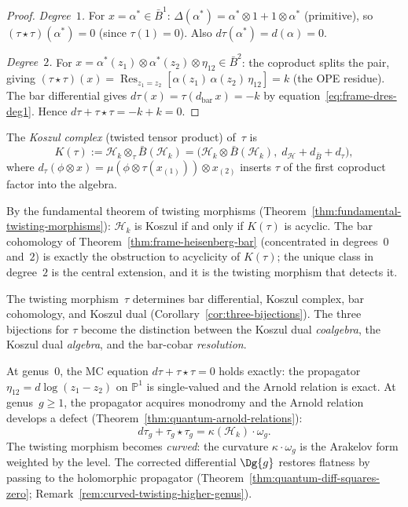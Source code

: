\begin{proof}
\emph{Degree~$1$.}
For $x = \alpha^* \in \bar{B}^1$:
$\Delta(\alpha^*) = \alpha^* \otimes 1
+ 1 \otimes \alpha^*$ (primitive), so
$(\tau \star \tau)(\alpha^*) = 0$ (since $\tau(1) = 0$).
Also $d\tau(\alpha^*) = d(\alpha) = 0$.

\emph{Degree~$2$.}
For $x = \alpha^*(z_1) \otimes \alpha^*(z_2) \otimes \eta_{12}
\in \bar{B}^2$: the coproduct splits the pair, giving
$(\tau \star \tau)(x)
= \operatorname{Res}_{z_1 = z_2}
 [\alpha(z_1)\,\alpha(z_2)\,\eta_{12}]
= k$
(the OPE residue).
The bar differential gives
$d\tau(x) = \tau(d_{\mathrm{bar}}\,x) = -k$ by
equation~\eqref{eq:frame-dres-deg1}.
Hence $d\tau + \tau \star \tau = -k + k = 0$.
\end{proof}

\begin{definition}
\label{def:frame-koszul-complex}
The \emph{Koszul complex} (twisted tensor product) of~$\tau$ is
\begin{equation}\label{eq:frame-koszul-complex}
K(\tau) := \mathcal{H}_k \otimes_\tau \bar{B}(\mathcal{H}_k)
= \bigl(\mathcal{H}_k \otimes \bar{B}(\mathcal{H}_k),\;
 d_{\mathcal{H}} + d_{\bar{B}} + d_\tau\bigr),
\end{equation}
where $d_\tau(\phi \otimes x) = \mu(\phi \otimes \tau(x_{(1)}))
\otimes x_{(2)}$ inserts $\tau$ of the first coproduct factor
into the algebra.
\end{definition}

By the fundamental theorem of twisting morphisms
(Theorem~\ref{thm:fundamental-twisting-morphisms}):
$\mathcal{H}_k$ is Koszul if and only if $K(\tau)$ is acyclic.
The bar cohomology of
Theorem~\ref{thm:frame-heisenberg-bar} (concentrated in
degrees~$0$ and~$2$) is exactly the obstruction to acyclicity
of $K(\tau)$; the unique class in degree~$2$ is the central
extension, and it is the twisting morphism that detects it.

The twisting morphism~$\tau$ determines bar differential, Koszul
complex, bar cohomology, and Koszul dual
(Corollary~\ref{cor:three-bijections}). The three bijections for
$\tau$ become the distinction between the Koszul dual
\emph{coalgebra}, the Koszul dual \emph{algebra}, and the bar-cobar
\emph{resolution}.

\begin{remark}
\label{rem:frame-twisting-higher-genus}
At genus~$0$, the MC equation $d\tau + \tau\star\tau = 0$ holds
exactly: the propagator $\eta_{12} = d\log(z_1 - z_2)$ on
$\mathbb{P}^1$ is single-valued and the Arnold relation is exact.
At genus~$g \geq 1$, the propagator acquires monodromy and the
Arnold relation develops a defect
(Theorem~\ref{thm:quantum-arnold-relations}):
\[
d\tau_g + \tau_g \star \tau_g = \kappa(\mathcal{H}_k) \cdot \omega_g.
\]
The twisting morphism becomes \emph{curved}: the curvature
$\kappa \cdot \omega_g$ is the Arakelov form weighted by the level.
The corrected differential $\Dg{g}$ restores flatness by passing
to the holomorphic propagator
(Theorem~\ref{thm:quantum-diff-squares-zero};
Remark~\ref{rem:curved-twisting-higher-genus}).
\end{remark}

